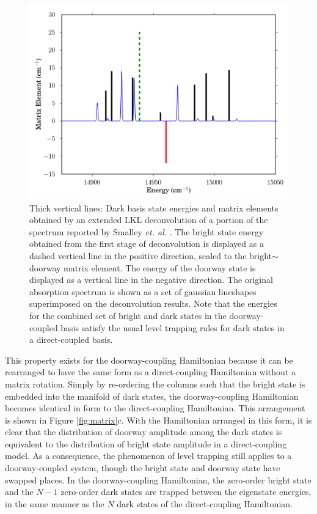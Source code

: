 \documentclass[12pt]{mitthesis}
\begin{document}
\begin{figure}
  \caption{Thick vertical lines: Dark basis state energies and matrix
    elements obtained by an extended LKL deconvolution of a portion of
    the  spectrum reported by Smalley \emph{et. al.}
    \cite{smalley75}.  The bright state energy obtained from the first
    stage of deconvolution is displayed as a dashed vertical line in
    the positive direction, scaled to the bright$\sim$doorway matrix
    element.  The energy of the doorway state is displayed as a
    vertical line in the negative direction.  The original absorption
    spectrum is shown as a set of gaussian lineshapes superimposed on
    the deconvolution results.  Note that the energies for the
    combined set of bright and dark states in the doorway-coupled
    basis satisfy the usual level trapping rules for dark states in a
    direct-coupled basis.}
  \label{fig:smalley-doorway}
  \centering
  \includegraphics[width=6in]{smalley-doorway.png}
\end{figure}

This property exists for the doorway-coupling Hamiltonian because it
can be rearranged to have the same form as a direct-coupling
Hamiltonian without a matrix rotation.  Simply by re-ordering the
columns such that the bright state is embedded into the manifold of
dark states, the doorway-coupling Hamiltonian becomes identical in
form to the direct-coupling Hamiltonian.  This arrangement is shown in
Figure \ref{fig:matrix}c.  With the Hamiltonian arranged in this form,
it is clear that the distribution of doorway amplitude among the dark
states is equivalent to the distribution of bright state amplitude in
a direct-coupling model.  As a consequence, the phenomenon of level
trapping still applies to a doorway-coupled system, though the bright
state and doorway state have swapped places.  In the doorway-coupling
Hamiltonian, the zero-order bright state and the $N-1$ zero-order dark
states are trapped between the eigenstate energies, in the same manner
as the $N$ dark states of the direct-coupling Hamiltonian.
\end{document}
